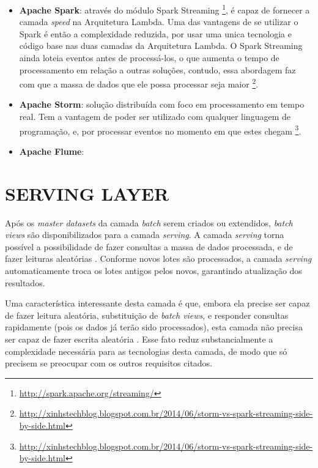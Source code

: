 \begin{itemize}
    \item \textbf{Apache Spark}: através do módulo Spark Streaming
\footnote{\url{http://spark.apache.org/streaming/}}, é capaz de fornecer a
camada \textit{speed} na Arquitetura Lambda. Uma das vantagens de se utilizar
o Spark é então a complexidade reduzida, por usar uma unica tecnologia e
código base nas duas camadas da Arquitetura Lambda. O Spark Streaming ainda
loteia eventos antes de processá-los, o que aumenta o tempo de processamento
em relação a outras soluções, contudo, essa abordagem faz com que a massa de
dados que ele possa processar seja maior
\footnote{\url{http://xinhstechblog.blogspot.com.br/2014/06/storm-vs-spark-streaming-side-by-side.html}}.

    \item \textbf{Apache Storm}: solução distribuída com foco em processamento
em tempo real. Tem a vantagem de poder ser utilizado com qualquer linguagem de
programação, e, por processar eventos no momento em que estes chegam
\footnote{\url{http://xinhstechblog.blogspot.com.br/2014/06/storm-vs-spark-streaming-side-by-side.html}}.

    \item \textbf{Apache Flume}:

\end{itemize}

\section{SERVING LAYER}

Após os \textit{master datasets} da camada \textit{batch} serem criados ou
extendidos, \textit{batch views} são disponibilizados para a camada
\textit{serving}. A camada \textit{serving} torna possível a possibilidade de
fazer consultas a massa de dados processada, e de fazer leituras aleatórias
\cite{marz2015}. Conforme novos lotes são processados, a camada \textit{serving}
automaticamente troca os lotes antigos pelos novos, garantindo atualização dos
resultados.

Uma característica interessante desta camada é que, embora ela precise ser
capaz de fazer leitura aleatória, substituição de \textit{batch views}, e
responder consultas rapidamente (pois os dados já terão sido processados),
esta camada não precisa ser capaz de fazer escrita aleatória \cite{marz2015}.
Esse fato reduz substancialmente a complexidade necessária para as tecnologias
desta camada, de modo que só precisem se preocupar com os outros requisitos
citados.

